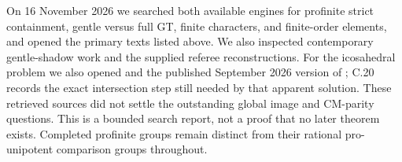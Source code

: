 On 16 November 2026 we searched
both available engines for
profinite strict containment,
gentle versus full GT, finite
characters, and finite-order
elements, and opened the
primary texts listed above.
We also inspected contemporary
gentle-shadow work and the
supplied referee reconstructions.
For the icosahedral problem we also opened
\citet{cBoggiZalesskii2025} and the published
September 2026 version of \citet{cBoggi2026};
C.20 records the exact intersection step still
needed by that apparent solution.
These retrieved sources did
not settle the outstanding
global image and CM-parity
questions. This is a bounded
search report, not a proof
that no later theorem exists.
Completed profinite groups
remain distinct from their
rational pro-unipotent
comparison groups throughout.
